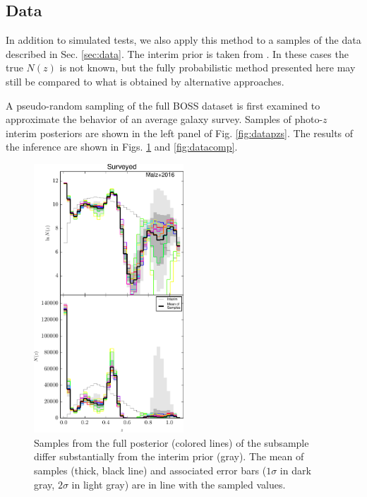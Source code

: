 \documentclass[preprint]{aastex}
\begin{document}
\subsection{Data}
\label{sec:boss}

In addition to simulated tests, we also apply this method to a samples of the 
data described in Sec. \ref{sec:data}.  The interim prior is taken from 
\citet{Sheldon2012}.  In these cases the true $N(z)$ is not known, but the 
fully probabilistic method presented here may still be compared to what is 
obtained by alternative approaches.

A pseudo-random sampling of the full BOSS dataset is first examined to 
approximate the behavior of an average galaxy survey.  Samples of photo-$z$ 
interim posteriors are shown in the left panel of Fig. \ref{fig:datapzs}.  The 
results of the inference are shown in Figs. \ref{fig:dataparam} and 
\ref{fig:datacomp}.  

\begin{figure}
\includegraphics[width=0.5\textwidth]{figs/boss/samps.pdf}
\caption{Samples from the full posterior (colored lines) of the subsample 
differ substantially from the interim prior (gray).  The mean of samples 
(thick, black line) and associated error bars ($1\sigma$ in dark gray, 
$2\sigma$ in light gray) are in line with the sampled values.}
\label{fig:dataparam}
\end{figure}
\end{document}
